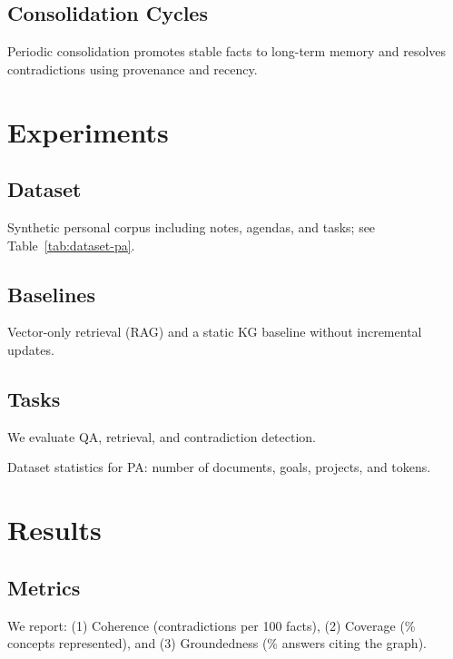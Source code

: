 \documentclass[10pt]{article}
\begin{document}

\subsection{Consolidation Cycles}
\label{subsec:consolidation}
Periodic consolidation promotes stable facts to long-term memory and resolves contradictions using provenance and recency.


\section{Experiments}
\subsection{Dataset}
Synthetic personal corpus including notes, agendas, and tasks; see Table~\ref{tab:dataset-pa}.

\subsection{Baselines}
Vector-only retrieval (RAG) and a static KG baseline without incremental updates.

\subsection{Tasks}
We evaluate QA, retrieval, and contradiction detection.

\begin{table}[t]
	\centering
	\caption{Dataset statistics for PA: number of documents, goals, projects, and tokens.}
	\label{tab:dataset-pa}
	
\end{table}

\section{Results}
\subsection{Metrics}
We report: (1) Coherence (contradictions per 100 facts), (2) Coverage (\% concepts represented), and (3) Groundedness (\% answers citing the graph).
\end{document}
